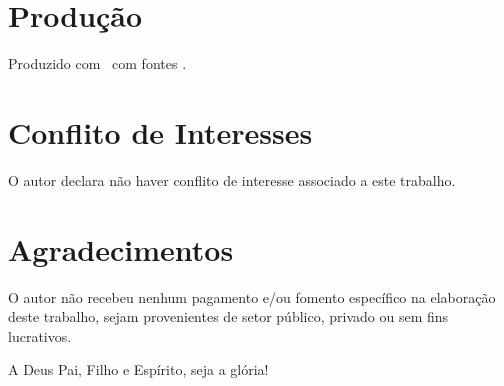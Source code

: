 
\section*{Produção}

    Produzido com \XeLaTeX\ com fontes .



\section*{Conflito de Interesses}

    O autor declara não haver conflito de interesse associado a este trabalho.



\section*{Agradecimentos}

    O autor não recebeu nenhum pagamento e/ou fomento específico na elaboração  deste  trabalho,  sejam  provenientes  de  setor
    público, privado ou sem fins lucrativos.

    A \YA{} Deus Pai, Filho e Espírito, seja a glória!




